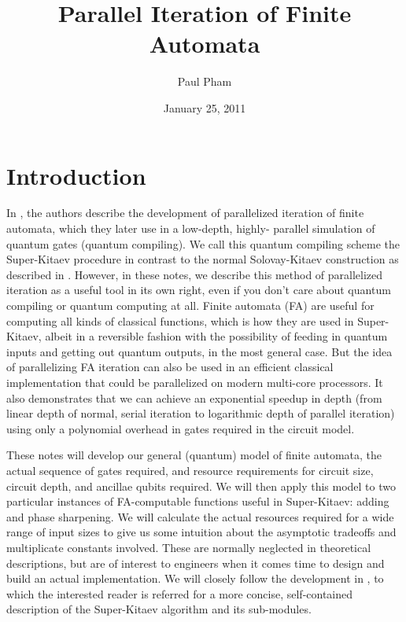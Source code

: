 \documentclass{article}
\title{Parallel Iteration of Finite Automata}
\date{January 25, 2011}
\author{Paul Pham}
\theoremstyle{plain}
\begin{document}
\newcommand{\braket}[2]{\langle #1|#2 \rangle}
\newcommand{\normtwo}{\frac{1}{\sqrt{2}}}
\newcommand{\norm}[1]{\parallel #1 \parallel}

\maketitle

\section{Introduction}

In \cite{KSV2002}, the authors describe the development of parallelized
iteration of finite automata, which they later use in a low-depth, highly-
parallel simulation of quantum gates (quantum compiling). We call this
quantum compiling
scheme the Super-Kitaev procedure in contrast to the normal
Solovay-Kitaev construction as described in \cite{nc00}.
However, in these notes, we describe
this method of parallelized iteration as a useful tool in its own right,
even if you don't care about quantum compiling or quantum computing at all.
Finite automata (FA) are useful for computing all kinds of classical functions,
which is how they are used in Super-Kitaev, albeit in a reversible fashion
with the possibility of feeding in quantum inputs and getting out quantum
outputs, in the most general case.
But the idea of parallelizing FA iteration can also be used in an
efficient classical implementation that could be parallelized on modern
multi-core processors. It also demonstrates that we can achieve an
exponential speedup in depth (from linear depth of normal, serial iteration to
logarithmic depth of parallel iteration) using only a polynomial overhead in
gates required in the circuit model.

These notes will develop our general (quantum) model of finite automata, the actual
sequence of gates required, and resource requirements for circuit size,
circuit depth, and ancillae qubits required. We will then
apply this model to two particular instances of FA-computable functions useful in
Super-Kitaev: adding and phase sharpening. We will calculate the actual resources
required for a wide range of input sizes to give us some intuition about the
asymptotic tradeoffs and multiplicate constants involved. These are normally
neglected in theoretical descriptions, but are of interest to engineers
when it comes time to design and build an actual implementation. We will closely
follow the development in \cite{KSV2002}, to which the interested reader is
referred for a more concise, self-contained description of the Super-Kitaev
algorithm and its sub-modules.
\end{document}
